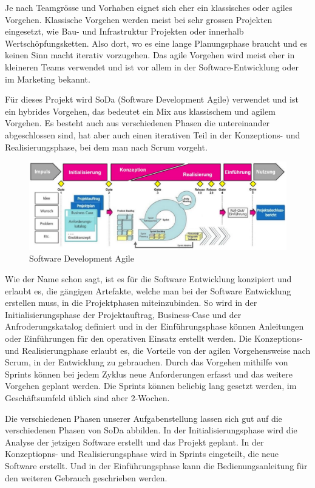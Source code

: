 \documentclass[a4paper, table]{article}
\begin{document}
Je nach Teamgrösse und Vorhaben eignet sich eher ein klassisches oder agiles Vorgehen.
Klassische Vorgehen werden meist bei sehr grossen Projekten eingesetzt, wie Bau- und Infrastruktur Projekten oder
innerhalb Wertschöpfungsketten. Also dort, wo es eine lange Planungsphase braucht und es keinen Sinn macht iterativ vorzugehen.
Das agile Vorgehen wird meist eher in kleineren Teams verwendet und ist vor allem in der Software-Entwicklung oder
im Marketing bekannt.
\newline

Für dieses Projekt wird SoDa (Software Development Agile) verwendet und ist ein hybrides Vorgehen,
das bedeutet ein Mix aus klassischem und agilem Vorgehen.
Es besteht auch aus verschiedenen Phasen die untereinander abgeschlossen sind,
hat aber auch einen iterativen Teil in der Konzeptions- und Realisierungsphase, bei dem man nach Scrum vorgeht.
\newpage

\begin{figure}[h]
    \centering
    \includegraphics[width=1.0\textwidth]{img/SoDa.png}
    \caption{Software Development Agile}
    \label{fig:SoDa}
\end{figure}


Wie der Name schon sagt, ist es für die Software Entwicklung konzipiert und erlaubt es, die gängigen Artefakte,
welche man bei der Software Entwicklung erstellen muss, in die Projektphasen miteinzubinden.
So wird in der Initialisierungsphase der Projektauftrag, Business-Case und der Anfroderungskatalog definiert und
in der Einführungsphase können Anleitungen oder Einführungen für den operativen Einsatz erstellt werden.
Die Konzeptions- und Realisierungphase erlaubt es, die Vorteile von der agilen Vorgehensweise nach Scrum,
in der Entwicklung zu gebrauchen. Durch das Vorgehen mithilfe von Sprints können bei jedem Zyklus neue
Anforderungen erfasst und das weitere Vorgehen geplant werden. Die Sprints können beliebig lang gesetzt werden,
im Geschäftsumfeld üblich sind aber 2-Wochen.


Die verschiedenen Phasen unserer Aufgabenstellung lassen sich gut auf die verschiedenen Phasen von SoDa abbilden.
In der Initialisierungsphase wird die Analyse der jetzigen Software erstellt und das Projekt geplant.
In der Konzeptiopns- und Realisierungsphase wird in Sprints eingeteilt, die neue Software erstellt.
Und in der Einführungsphase kann die Bedienungsanleitung für den weiteren Gebrauch geschrieben werden.
\end{document}
